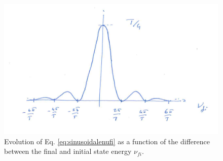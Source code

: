 \begin{figure}
    \includegraphics[scale=0.2]{Figures/qscat1.pdf}
    \caption{Evolution of Eq. \eqref{eq:sinusoidalenufi} as a function of the difference between the final and initial state energy $\nu_{fi}$.}
    \label{fig:quantum-scattering:1}
\end{figure}

